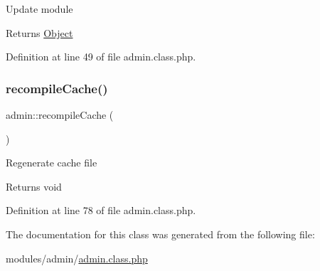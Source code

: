 Update module \begin{DoxyReturn}{Returns}
\hyperlink{classObject}{Object} 
\end{DoxyReturn}


Definition at line 49 of file admin.\+class.\+php.

\hypertarget{classadmin_a8392699186aca87dc8ce11546c2f715f}{}\label{classadmin_a8392699186aca87dc8ce11546c2f715f} 
\subsubsection{\texorpdfstring{recompile\+Cache()}{recompileCache()}}
{\footnotesize\ttfamily admin\+::recompile\+Cache (\begin{DoxyParamCaption}{ }\end{DoxyParamCaption})}

Regenerate cache file \begin{DoxyReturn}{Returns}
void 
\end{DoxyReturn}


Definition at line 78 of file admin.\+class.\+php.



The documentation for this class was generated from the following file\+:\begin{DoxyCompactItemize}
\item 
modules/admin/\hyperlink{admin_8class_8php}{admin.\+class.\+php}\end{DoxyCompactItemize}
